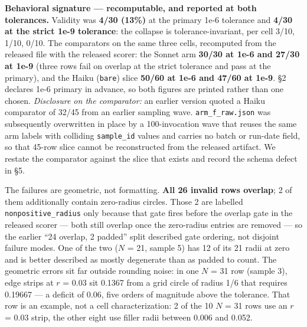 \documentclass[11pt]{article}
\begin{document}
\textbf{Behavioral signature --- recomputable, and reported at both tolerances.} Validity was
\textbf{4/30 (13\%)} at the primary 1e-6 tolerance and \textbf{4/30 at the strict 1e-9 tolerance}:
the collapse is tolerance-invariant, per cell 3/10, 1/10, 0/10. The comparators on the
same three cells, recomputed from the released file with the released scorer: the Sonnet
arm \textbf{30/30 at 1e-6 and 27/30 at 1e-9} (three rows fail on overlap at the strict
tolerance and pass at the primary), and the Haiku (\texttt{bare}) slice \textbf{50/60 at 1e-6 and
47/60 at 1e-9}. \S2 declares 1e-6 primary in advance, so both figures are printed rather
than one chosen. \emph{Disclosure on the comparator:} an earlier version quoted a Haiku
comparator of 32/45 from an earlier sampling wave. \texttt{arm\_f\_raw.json} was subsequently
overwritten in place by a 100-invocation wave that reuses the same arm labels with
colliding \texttt{sample\_id} values and carries no batch or run-date field, so that 45-row slice
cannot be reconstructed from the released artifact. We restate the comparator against the
slice that exists and record the schema defect in \S5.

The failures are geometric, not formatting. \textbf{All 26 invalid rows overlap}; 2 of them
additionally contain zero-radius circles. Those 2 are labelled \texttt{nonpositive\_radius} only
because that gate fires before the overlap gate in the released scorer --- both still
overlap once the zero-radius entries are removed --- so the earlier ``24 overlap, 2 padded''
split described gate ordering, not disjoint failure modes. One of the two ($N$ = 21, sample
5) has 12 of its 21 radii at zero and is better described as mostly degenerate than as
padded to count. The geometric errors sit far outside rounding noise: in one $N$ = 31 row
(sample 3), edge strips at $r$ = 0.03 sit 0.1367 from a grid circle of radius 1/6 that
requires 0.19667 --- a deficit of 0.06, five orders of magnitude above the tolerance. That
row is an example, not a cell characterization: 2 of the 10 $N$ = 31 rows use an $r$ = 0.03
strip, the other eight use filler radii between 0.006 and 0.052.
\end{document}

